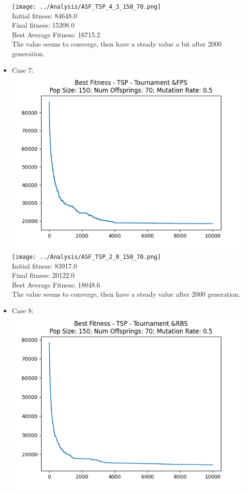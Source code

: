 \documentclass[12pt]{report} %
\begin{document}
\begin{itemize}
	      \texttt{[image: ../Analysis/ASF\_TSP\_4\_3\_150\_70.png]}
	      \\Initial fitness:  84648.0
	      \\Final fitness:  15208.0
	      \\Best Average Fitness: 16715.2
	      \\The value seems to converge, then have a steady value a bit after 2000 generation.
	\item Case 7:\\
	      \includegraphics[scale=0.5]{../Analysis/BSF_TSP_2_0_150_70.png}
	      \texttt{[image: ../Analysis/ASF\_TSP\_2\_0\_150\_70.png]}
	      \\Initial fitness:  83917.0
	      \\Final fitness:  20122.0
	      \\Best Average Fitness: 18048.6
	      \\The value seems to converge, then have a steady value after 2000 generation.
	\item Case 8:\\
	      \includegraphics[scale=0.5]{../Analysis/BSF_TSP_2_1_150_70.png}

\end{itemize}
\end{document}
